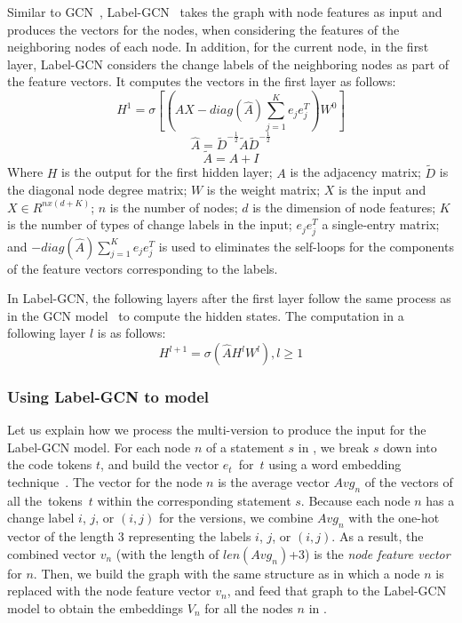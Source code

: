 Similar to GCN~\cite{gcn}, Label-GCN~\cite{label-gcn} takes the graph
with node features as input and produces the vectors for the nodes,
when considering the features of the neighboring nodes of each node.
In addition, for the current node, in the first layer, Label-GCN
considers the change labels of the neighboring nodes as part of the
feature vectors. It computes the vectors in the first layer as
follows:
\begin{equation}\label{eq1}
	H^1 = \sigma [(\hat{A}X-diag(\hat{A})\sum_{j=1}^{K}e_je^T_j)W^0]
\end{equation}
\begin{equation}\label{eq2}
	\hat{A} = \tilde{D}^{-\frac{1}{2}}\tilde{A}\tilde{D}^{-\frac{1}{2}}
\end{equation}
\begin{equation}\label{eq3}
	\tilde{A} = A + I
\end{equation}
Where $H$ is the output for the first hidden layer; $A$ is the
adjacency matrix; $\tilde{D}$ is the diagonal node degree matrix; $W$
is the weight matrix; $X$ is the input and $X \in R^{nx(d+K)}$; $n$ is
the number of nodes; $d$ is the dimension of node features; $K$ is the
number of types of change labels in the input; $e_je^T_j$ a single-entry
matrix; and $-diag(\hat{A})\sum_{j=1}^{K}e_je^T_j$ is used to
eliminates the self-loops for the components of the feature vectors
corresponding to the labels.


In Label-GCN, the following layers after the first layer follow the
same process as in the GCN model~\cite{gcn} to compute the hidden
states. The computation in a following layer $l$ is as follows:
\begin{equation}\label{eq4}
	H^{l+1} = \sigma (\hat{A}H^lW^l), l \geq 1
\end{equation}
\subsubsection{{\bf Using Label-GCN to model {\mvpdg}}}
\label{sec:preprocess}
Let us explain how we process the multi-version {\mvpdg} to produce
the input for the Label-GCN model. For each node $n$ of a statement
$s$ in {\mvpdg}, we break $s$ down into the code tokens $t$, and build
the vector $e_t$~for~$t$ using a word embedding
technique~\cite{glove2014}. The vector for the node $n$ is the average
vector $Avg_n$ of the vectors of all the~tokens~$t$ within the
corresponding statement $s$. Because each node $n$ has a change label
$i$, $j$, or $(i,j)$ for the versions, we combine $Avg_n$ with the
one-hot vector of the length 3 representing the labels $i$, $j$, or
$(i,j)$. As a result, the combined vector $v_n$ (with the length of
$len(Avg_n)$+3) is the {\em node feature vector} for $n$. Then, we
build the graph with the same structure as {\mvpdg} in which a node
$n$ is replaced with the node feature vector $v_n$, and feed that
graph to the Label-GCN model to obtain the embeddings $V_n$ for all
the nodes $n$ in {\mvpdg}.


